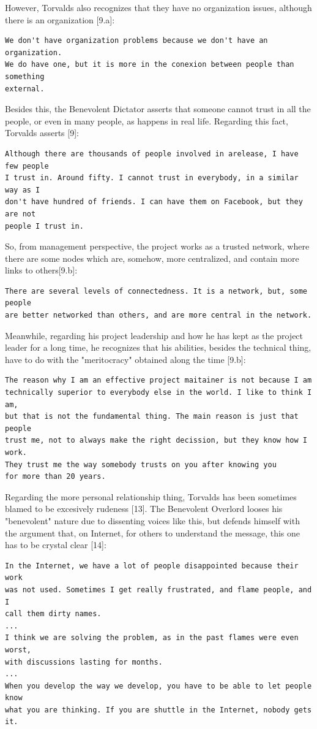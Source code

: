 \documentclass[11pt]{article}
\begin{document}
However, Torvalds also recognizes that they have no organization issues, although there is an organization [9.a]:
\begin{verbatim}
We don't have organization problems because we don't have an organization.
We do have one, but it is more in the conexion between people than something 
external.
\end{verbatim}
Besides this, the Benevolent Dictator asserts that someone cannot trust in all the people, or even in many people, as happens in real life. Regarding this fact, Torvalds asserts [9]:
\begin{verbatim}
Although there are thousands of people involved in arelease, I have few people 
I trust in. Around fifty. I cannot trust in everybody, in a similar way as I 
don't have hundred of friends. I can have them on Facebook, but they are not
people I trust in.
\end{verbatim}
So, from management perspective, the project works as a trusted network, where there are some nodes which are, somehow, more centralized, and contain more links to others[9.b]:
\begin{verbatim}
There are several levels of connectedness. It is a network, but, some people 
are better networked than others, and are more central in the network.
\end{verbatim}
Meanwhile, regarding his project leadership and how he has kept as the project leader for a long time, he recognizes that his abilities, besides the technical thing, have to do with the "meritocracy" obtained along the time [9.b]:
\begin{verbatim}
The reason why I am an effective project maitainer is not because I am 
technically superior to everybody else in the world. I like to think I am, 
but that is not the fundamental thing. The main reason is just that people 
trust me, not to always make the right decission, but they know how I work. 
They trust me the way somebody trusts on you after knowing you
for more than 20 years.
\end{verbatim}
Regarding the more personal relationship thing, Torvalds has been sometimes blamed to be excesively rudeness [13]. The Benevolent Overlord looses his "benevolent" nature due to dissenting voices like this, but defends himself with the argument that, on Internet, for others to understand the message, this one has to be crystal clear [14]:
\begin{verbatim}
In the Internet, we have a lot of people disappointed because their work 
was not used. Sometimes I get really frustrated, and flame people, and I 
call them dirty names.
...
I think we are solving the problem, as in the past flames were even worst, 
with discussions lasting for months.
...
When you develop the way we develop, you have to be able to let people know 
what you are thinking. If you are shuttle in the Internet, nobody gets it.
\end{verbatim}
\end{document}
